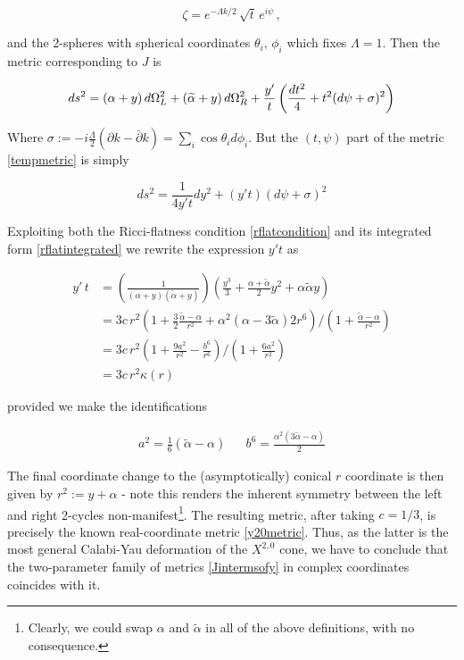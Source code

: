 \begin{equation}
	\zeta = e^{-\Lambda k/2}\, \sqrt{t} \,e^{i\psi}\,,
\end{equation}

and the 2-spheres with spherical coordinates $\theta_i$, $\phi_i$ which fixes $\Lambda = 1$. Then the metric corresponding to $J$ is

\begin{equation}
	ds^2 = (\alpha+y)\, d\Omega^2_L + (\widetilde{\alpha} + y) \,d\Omega^2_R + \frac{y'}{t} \left( \frac{dt^2}{4} + t^2 (d\psi + \sigma)^2 \right)\label{tempmetric}
\end{equation}

Where $\sigma := -i\frac{\Lambda}{2}(\partial k - \bar \partial k) = \sum_i \cos\theta_i d\phi_i$. But the $(t,\psi)$ part of the metric \eqref{tempmetric} is simply

\begin{equation}
	ds^2 = \frac{1}{4y't} dy^2 + (y' t) (d\psi + \sigma)^2
\end{equation}

Exploiting both the Ricci-flatness condition \eqref{rflatcondition} and its integrated form \eqref{rflatintegrated} we rewrite the expression $y't$ as

\begin{align}
	y'\,t & = \left(\frac{1}{(\alpha + y)(\tilde\alpha + y)}\right) \left( \frac{y^3}{3} + \frac{\alpha + \tilde{\alpha}}{2} y^2 + \alpha \tilde{\alpha} y \right)\\
	& = 3c\,r^2 \left(
	{1+ \frac{3}{2} \frac{\tilde{\alpha} - \alpha}{r^2} + {\alpha^{2}(\alpha - 3 \tilde{\alpha})}{2r^6} }
	\right)\bigg/\left({1+ \frac{\tilde{\alpha} -\alpha}{r^2} }\right)\\
	& = 3c\,r^2 \left({1+\frac{9a^2}{r^2} - \frac{b^6}{r^6}}\right)\bigg/\left({1 + \frac{6a^2}{r^2}}\right) \\
	& = 3c\,r^2 \kappa(r)
\end{align}

provided we make the identifications

\begin{align}
	a^2 = \frac{1}{6}(\tilde{\alpha} - \alpha) && b^6 = \frac{\alpha^{2}(3\tilde{\alpha}-\alpha)}2
	\label{}
\end{align}

The final coordinate change to the (asymptotically) conical $r$ coordinate is then given by $r^2 := y + \alpha$ - note this renders the inherent symmetry between the left and right 2-cycles non-manifest\footnote{Clearly, we could swap $\alpha$ and $\tilde{\alpha}$ in all of the above definitions, with no consequence.}. The resulting metric, after taking $c=1/3$, is precisely the known real-coordinate metric \eqref{y20metric}. Thus, as the latter is the most general Calabi-Yau deformation of the $X^{2,0}$ cone, we have to conclude that the two-parameter family of metrics \eqref{Jintermsofy} in complex coordinates coincides with it.

